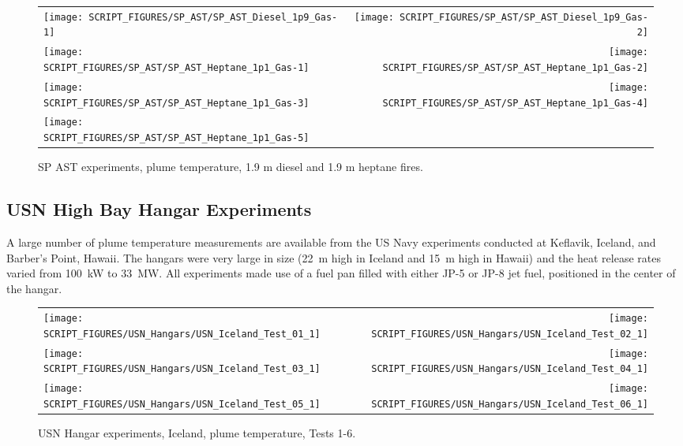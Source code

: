 \newpage

\begin{figure}[p]
\begin{tabular*}{\textwidth}{l@{\extracolsep{\fill}}r}
\texttt{[image: SCRIPT\_FIGURES/SP\_AST/SP\_AST\_Diesel\_1p9\_Gas-1]}   &  \texttt{[image: SCRIPT\_FIGURES/SP\_AST/SP\_AST\_Diesel\_1p9\_Gas-2]}    \\
\texttt{[image: SCRIPT\_FIGURES/SP\_AST/SP\_AST\_Heptane\_1p1\_Gas-1]}  &  \texttt{[image: SCRIPT\_FIGURES/SP\_AST/SP\_AST\_Heptane\_1p1\_Gas-2]}    \\
\texttt{[image: SCRIPT\_FIGURES/SP\_AST/SP\_AST\_Heptane\_1p1\_Gas-3]}  &  \texttt{[image: SCRIPT\_FIGURES/SP\_AST/SP\_AST\_Heptane\_1p1\_Gas-4]}     \\
\texttt{[image: SCRIPT\_FIGURES/SP\_AST/SP\_AST\_Heptane\_1p1\_Gas-5]}  &
\end{tabular*}
\caption[SP AST experiments, plume temperature, 1.9 m diesel and 1.1 m heptane fires]
{SP AST experiments, plume temperature, 1.9 m diesel and 1.9 m heptane fires.}
\label{SP_Diesel_1p9_Gas}
\end{figure}

\clearpage

\subsection{USN High Bay Hangar Experiments}

\label{USN_Plume}

A large number of plume temperature measurements are available from the US Navy experiments conducted at Keflavik, Iceland, and Barber's Point, Hawaii. The hangars were very large in size (22~m high in Iceland and 15~m high in Hawaii) and the heat release rates varied from 100~kW to 33~MW. All experiments made use of a fuel pan filled with either JP-5 or JP-8 jet fuel, positioned in the center of the hangar.


\begin{figure}[h!]
\begin{tabular*}{\textwidth}{l@{\extracolsep{\fill}}r}
\texttt{[image: SCRIPT\_FIGURES/USN\_Hangars/USN\_Iceland\_Test\_01\_1]} &
\texttt{[image: SCRIPT\_FIGURES/USN\_Hangars/USN\_Iceland\_Test\_02\_1]} \\
\texttt{[image: SCRIPT\_FIGURES/USN\_Hangars/USN\_Iceland\_Test\_03\_1]} &
\texttt{[image: SCRIPT\_FIGURES/USN\_Hangars/USN\_Iceland\_Test\_04\_1]} \\
\texttt{[image: SCRIPT\_FIGURES/USN\_Hangars/USN\_Iceland\_Test\_05\_1]} &
\texttt{[image: SCRIPT\_FIGURES/USN\_Hangars/USN\_Iceland\_Test\_06\_1]} \\
\end{tabular*}
\caption[USN Hangar experiments, Iceland, plume temperature, Tests 1-6]
{USN Hangar experiments, Iceland, plume temperature, Tests 1-6.}
\label{USN_Plume_Iceland_1}
\end{figure}

